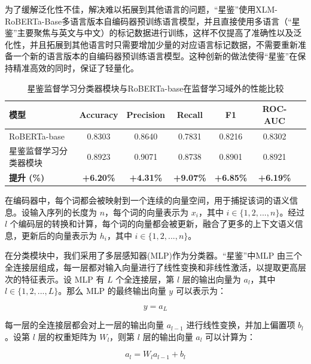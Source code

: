 \documentclass[a4paper]{report}
\begin{document}
为了缓解泛化性不佳，解决难以拓展到其他语言的问题，“星鉴”使用XLM-RoBERTa-Base多语言版本自编码器预训练语言模型，并且直接使用多语言（“星鉴”主要聚焦与英文与中文）的标记数据进行训练，这样不仅提高了准确性以及泛化性，并且拓展到其他语言时只需要增加少量的对应语言标记数据，不需要重新准备一个新的语言版本的自编码器预训练语言模型。这种创新的做法使得“星鉴”在保持精准高效的同时，保证了轻量化。
\begin{table}[H]
	\centering
	\begin{tabular}{lcccccc}
		\toprule
		\textbf{模型}      & \textbf{Accuracy} & \textbf{Precision} & \textbf{Recall}  & \textbf{F1}      & \textbf{ROC-AUC} \\
		\midrule
		RoBERTa-base     & 0.8303            & 0.8640             & 0.7831           & 0.8216           & 0.8302           \\
		星鉴监督学习分类器模块      & 0.8923            & 0.9071             & 0.8738           & 0.8901           & 0.8921           \\
		\midrule
		\textbf{提升 (\%)} & \textbf{+6.20\%}  & \textbf{+4.31\%}   & \textbf{+9.07\%} & \textbf{+6.85\%} & \textbf{+6.19\%} \\
		\bottomrule
	\end{tabular}
	\caption{星鉴监督学习分类器模块与RoBERTa-base在监督学习域外的性能比较}
	\label{tab:性能提升}
\end{table}

在编码器中，每个词都会被映射到一个连续的向量空间，用于捕捉该词的语义信息。设输入序列的长度为 $n$，每个词的向量表示为 $x_i$，其中 $i \in \{1, 2, ..., n\}$。经过 $l$ 个编码层的转换和计算，每个词的向量都会被更新，融合了更多的上下文语义信息，更新后的向量表示为 $h_i$，其中 $i \in \{1, 2, ..., n\}$。

在分类模块中，我们采用了多层感知器(MLP)作为分类器。“星鉴”中MLP 由三个全连接层组成，每一层都对输入向量进行了线性变换和非线性激活，以提取更高层次的特征表示。设 MLP 有 $L$ 个全连接层，第 $l$ 层的输出向量为 $a_l$，其中 $l \in \{1, 2, ..., L\}$。那么 MLP 的最终输出向量 $y$ 可以表示为：

\begin{equation}
	y = a_L
\end{equation}

每一层的全连接层都会对上一层的输出向量 $a_{l-1}$ 进行线性变换，并加上偏置项 $b_l$。设第 $l$ 层的权重矩阵为 $W_l$，则第 $l$ 层的输出向量 $a_l$ 可以计算为：

\begin{equation}
	a_l = W_l a_{l-1} + b_l
\end{equation}
\end{document}
